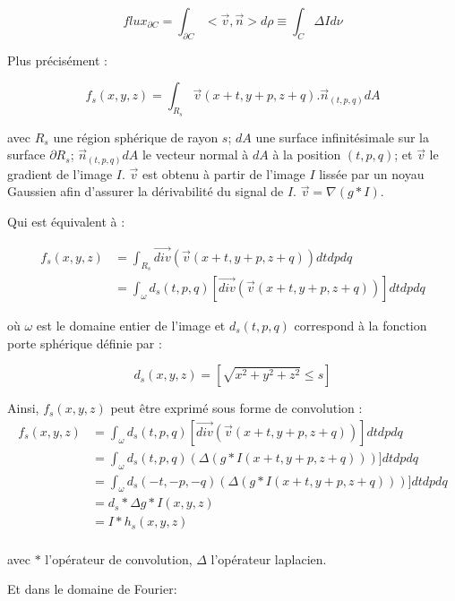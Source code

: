 {\begin{equation}
  flux_{\partial C} = \int_{\partial C}< \vec{v},\vec{n} > d\rho \equiv \int_{C }\Delta I d\nu
\end{equation}

Plus précisément :

\begin{equation}
  f_s(x,y,z) = \int_{R_s}\vec{v}(x+t,y+p, z+q) . \vec{n}_{(t,p,q)}dA
\end{equation}

avec $R_s$ une région sphérique de rayon $s$; $dA$ une surface infinitésimale sur la surface $\partial R_s$; $\vec{n}_{(t,p,q)}dA$ le vecteur normal à $dA$ à la position $(t,p,q)$; et $\vec{v}$ le gradient de l'image $I$. $\vec{v}$ est obtenu à partir de l'image $I$ lissée par un noyau Gaussien afin d'assurer la dérivabilité du signal de $I$. $\vec{v}=\nabla(g*I)$.

Qui est équivalent à :

\begin{align}
  f_s(x,y,z) & = \int_{R_s} \vec{div}( \vec{v}(x+t,y+p, z+q) ) dtdpdq \\
  & = \int_{\omega} d_s(t,p,q) [\vec{div}( \vec{v}(x+t,y+p, z+q) )] dtdpdq
\end{align}

où $\omega$ est le domaine entier de l'image et $d_s(t,p,q)$ correspond à la fonction porte sphérique définie par :

\begin{equation}
d_s(x,y,z) = [\sqrt{x^2 + y^2 + z^2} \leq s]
\end{equation}

Ainsi, $f_s(x,y,z)$ peut être exprimé sous forme de convolution :
\begin{align}
  f_s(x,y,z) & = \int_{\omega} d_s(t,p,q) [\vec{div}( \vec{v}(x+t,y+p, z+q) )] dtdpdq \\
             & = \int_{\omega} d_s(t,p,q) (\Delta(g*I(x+t,y+p, z+q)))] dtdpdq \\
             & = \int_{\omega} d_s(-t,-p,-q) (\Delta(g*I(x+t,y+p, z+q)))] dtdpdq \\
             & = d_s * \Delta g * I(x,y,z) \\
             & = I * h_s(x,y,z) \\
\end{align}

avec $*$ l'opérateur de convolution, $\Delta$ l'opérateur laplacien.

Et dans le domaine de Fourier:

}
